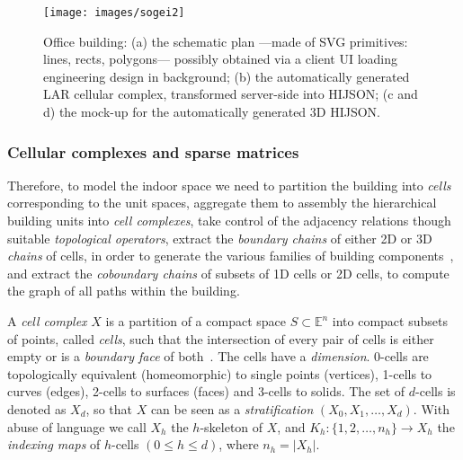\documentclass[]{egpubl}
\def\E{\mathbb{E}}
\begin{document}
\begin{figure}[h]
 \centering
 \texttt{[image: images/sogei2]} 
 \caption{Office building: 
 (a) the schematic plan ---made of SVG primitives: 
 lines, rects, polygons--- possibly obtained via a client UI 
 loading engineering design in background;
 (b) the automatically generated LAR cellular complex, transformed 
 server-side into HIJSON; 
 (c and d) the mock-up for the automatically generated 3D HIJSON.
 }
 \label{fig:sogei}
\end{figure}

\subsubsection*{Cellular complexes and sparse matrices} 

Therefore, to model the indoor space we need to partition the building into \emph{cells} corresponding to the unit spaces, aggregate them to assembly the hierarchical  building units into \emph{cell complexes}, take control of the adjacency relations though suitable \emph{topological operators}, extract the \emph{boundary chains} of either 2D or 3D \emph{chains} of cells, in order to generate the various families of building components~\cite{paoluzziMS:2014}, and extract the \emph{coboundary chains} of subsets of 1D cells or 2D cells, to compute the graph of all paths within the building.

A \emph{cell complex} $X$ is a partition of a compact space $S \subset \E^n$ into compact subsets of points, called \emph{cells}, such that the intersection of every pair of cells is either empty or is a \emph{boundary face} of both~\cite{hatcher:2002,ghrist:2014}. The cells have a \emph{dimension}. 0-cells are topologically equivalent (homeomorphic) to single points (vertices), 1-cells to curves (edges), 2-cells to surfaces (faces) and 3-cells to solids.  The set of $d$-cells is denoted as $X_d$, so that $X$ can be seen as a \emph{stratification} $(X_0, X_1, \ldots, X_d)$. With abuse of language we call $X_h$ the $h$-skeleton of $X$, and $K_h: \{1,2,\ldots,n_h\} \to X_h$ the \emph{indexing maps} of $h$-cells $(0\leq h\leq d)$, where $n_h=|X_h|$. 


\end{document}
